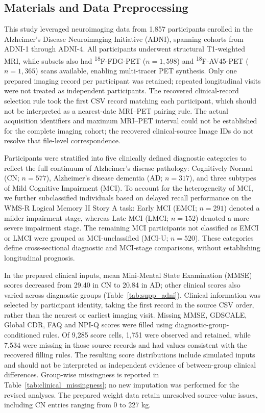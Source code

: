 \documentclass{article}
\begin{document}
\subsection{Materials and Data Preprocessing}
This study leveraged neuroimaging data from 1,857 participants enrolled in the Alzheimer’s Disease Neuroimaging Initiative (ADNI), spanning cohorts from ADNI-1 through ADNI-4. All participants underwent structural T1-weighted MRI, while subsets also had \textsuperscript{18}F-FDG-PET ($n = 1,598$) and \textsuperscript{18}F-AV45-PET ($n = 1,365$) scans available, enabling multi-tracer PET synthesis. Only one prepared imaging record per participant was retained; repeated longitudinal visits were not treated as independent participants. The recovered clinical-record selection rule took the first CSV record matching each participant, which should not be interpreted as a nearest-date MRI--PET pairing rule. The actual acquisition identifiers and maximum MRI--PET interval could not be established for the complete imaging cohort; the recovered clinical-source Image IDs do not resolve that file-level correspondence.

Participants were stratified into five clinically defined diagnostic categories to reflect the full continuum of Alzheimer’s disease pathology: Cognitively Normal (CN; $n = 577$), Alzheimer’s disease dementia (AD; $n = 317$), and three subtypes of Mild Cognitive Impairment (MCI). To account for the heterogeneity of MCI, we further subclassified individuals based on delayed recall performance on the WMS-R Logical Memory II Story A task: Early MCI (EMCI; $n = 291$) denoted a milder impairment stage, whereas Late MCI (LMCI; $n = 152$) denoted a more severe impairment stage. The remaining MCI participants not classified as EMCI or LMCI were grouped as MCI-unclassified (MCI-U; $n = 520$). These categories define cross-sectional diagnostic and MCI-stage comparisons, without establishing longitudinal prognosis.

In the prepared clinical inputs, mean Mini-Mental State Examination (MMSE) scores decreased from 29.40 in CN to 20.84 in AD; other clinical scores also varied across diagnostic groups (Table~\ref{tab:supp_adni}). Clinical information was selected by participant identity, taking the first record in the source CSV order, rather than the nearest or earliest imaging visit. Missing MMSE, GDSCALE, Global CDR, FAQ and NPI-Q scores were filled using diagnostic-group-conditioned rules. Of 9,285 score cells, 1,751 were observed and retained, while 7,534 were missing in those source records and had values consistent with the recovered filling rules. The resulting score distributions include simulated inputs and should not be interpreted as independent evidence of between-group clinical differences. Group-wise missingness is reported in Table~\ref{tab:clinical_missingness}; no new imputation was performed for the revised analyses. The prepared weight data retain unresolved source-value issues, including CN entries ranging from 0 to 227 kg.
\end{document}

